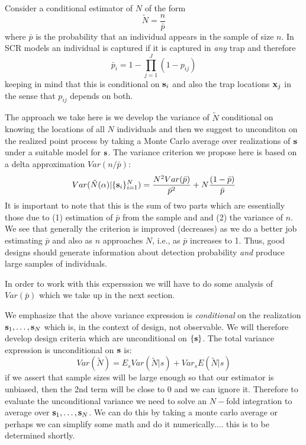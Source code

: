 \documentclass[useAMS,referee]{biom}
\begin{document}
Consider a conditional estimator of $N$ of the form
\[
  \tilde{N}  =  \frac{n}{\bar{p}}
\]
where $\bar{p}$ is the probability that an individual appears in the
sample of size $n$. In SCR models 
 an individual is captured if it is captured in {\it
  any} trap and therefore
\[
 \bar{p}_{i} = 1 - \prod_{j=1}^{J} (1- p_{ij})
\]
keeping in mind that this is conditional on ${\bf s}_{i}$ and also the
trap locations ${\bf x}_{j}$ in the sense
that $p_{ij}$ depends on both.

The approach we take here is we develop the variance of $\tilde{N}$
conditional on knowing the locations of all $N$ individuals and then
we suggest to unconditon on the realized point process by taking a
Monte Carlo average over realizations of ${\bf s}$ under a suitable
model for ${\bf s}$. The variance criterion we propose here is based
on a delta approximation $Var(n/\bar{p})$:
\[
 Var(\tilde{N}(\alpha) | \{ {\bf s}_{i} \}_{i=1}^{N} ) = 
\frac{N^{2} Var(\bar{p})}{\bar{p}^{2}}  + N\frac{(1-\bar{p})}{\bar{p}}
\]
It is important to note that this is the sum of two parts which are
essentially those due to (1) estimation of $\bar{p}$ from the sample
and and (2) the variance of $n$. We see that generally the criterion is improved
(decreases) as we do a better job estimating $\bar{p}$ and also as $n$
approaches $N$, i.e., as $\bar{p}$ increases to 1. Thus, good designs
should generate information about detection probability {\it and}
produce large samples of individuals. 

In order to work with this expersssion we will
have to do some analysis of $Var(\bar{p})$ which we take up in the
next section.

We emphasize  that the above variance expression
is {\it conditional} on the realization  ${\bf s}_{1},\ldots, {\bf
  s}_{N}$ which is, in the 
context of design, not observable.  We will therefore develop design
criteria which are unconditional on $\{ {\bf s} \}$.
The total variance expression is unconditional on ${\bf s}$ is:
\[
Var(\tilde{N}) = E_{s} Var(\tilde{N}|s) + Var_{s} E(\tilde{N}|s)
\]
if we assert that sample sizes will be large enough so that our
estimator is unbiased, then the 2nd term will be close to 0 and we can
ignore it. 
Therefore to evaluate the unconditional variance we need to solve an
$N-$fold integration to average over ${\bf s}_{1},\ldots, {\bf
  s}_{N}$.
We can do this by taking a monte carlo average or perhaps we can
simplify some math and do it numerically.... this is to be determined
shortly. 
\end{document}
